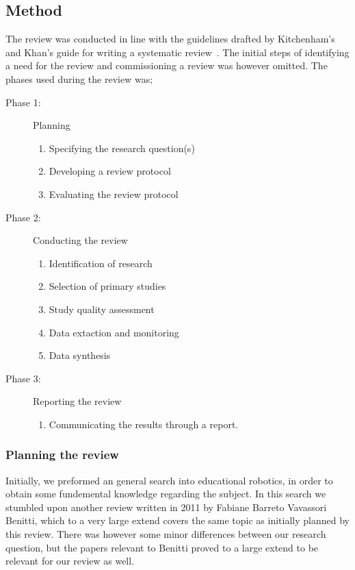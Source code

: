 \subsection{Method}
The review was conducted in line with the guidelines drafted by Kitchenham's and Khan's guide for writing a systematic review~\cite{kitchenham2007guidelines,khan2001undertaking}. 
The initial steps of identifying a need for the review and commissioning a review was however omitted. 
The phases used during the review was; 
\begin{description}
	\item[Phase 1: ] Planning
		\begin{enumerate}
			\item Specifying the research question(s)
			\item Developing a review protocol
			\item Evaluating the review protocol
		\end{enumerate}
	\item[Phase 2: ] Conducting the review
		\begin{enumerate}
			\item Identification of research
			\item Selection of primary studies
			\item Study quality assessment
			\item Data extaction and monitoring
			\item Data synthesis
		\end{enumerate}
	\item[Phase 3: ] Reporting the review
		\begin{enumerate}
			\item Communicating the results through a report.
		\end{enumerate}
\end{description}

\subsubsection{Planning the review}\label{sec:questions}
Initially, we preformed an general search into educational robotics, in order to obtain some fundemental knowledge regarding the subject. In this search we stumbled upon another review written in 2011 by Fabiane Barreto Vavassori Benitti\cite{Benitti2012978}, which to a very large extend covers the same topic as initially planned by this review. There was however some minor differences between our research question, but the papers relevant to Benitti proved to a large extend to be relevant for our review as well. 

